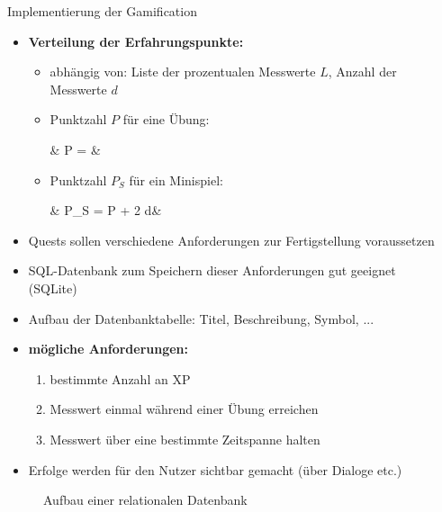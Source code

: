 \documentclass[final,20pt]{beamer}
\newlength{\sepwidth}
\newlength{\colwidth}
\newcommand{\separatorcolumn}{\begin{column}{\sepwidth}\end{column}}
\begin{document}
\begin{frame}[t]
\begin{columns}[t]
\begin{column}{\colwidth}
	\begin{alertblock}{Implementierung der Gamification}
		\begin{itemize}
			\item \textbf{Verteilung der Erfahrungspunkte:}
			\begin{itemize}
				\item abhängig von: Liste der prozentualen Messwerte $L$, Anzahl der Messwerte $d$
				\item Punktzahl $P$ für eine Übung:
				\begin{flalign*}
				& P = &
				\end{flalign*}
				\item Punktzahl $P_{S}$ für ein Minispiel:
				\begin{flalign*}
				& P_{S} = P + 2 \cdot d&
				\end{flalign*}
			\end{itemize}
			\item Quests sollen verschiedene Anforderungen zur Fertigstellung voraussetzen
			\item SQL-Datenbank zum Speichern dieser Anforderungen gut geeignet (SQLite)
			\item Aufbau der Datenbanktabelle: Titel, Beschreibung, Symbol, ...
			\item \textbf{mögliche Anforderungen:}
			\begin{enumerate}
				\item bestimmte Anzahl an XP
				\item Messwert einmal während einer Übung erreichen
				\item Messwert über eine bestimmte Zeitspanne halten
			\end{enumerate}
			\item Erfolge werden für den Nutzer sichtbar gemacht (über Dialoge etc.)
		\end{itemize}
		\begin{figure}[H]
			\centering
			
			\caption{Aufbau einer relationalen Datenbank}
		\end{figure}
	\end{alertblock}

\end{column}

\separatorcolumn
\end{columns}
\end{frame}
\end{document}
